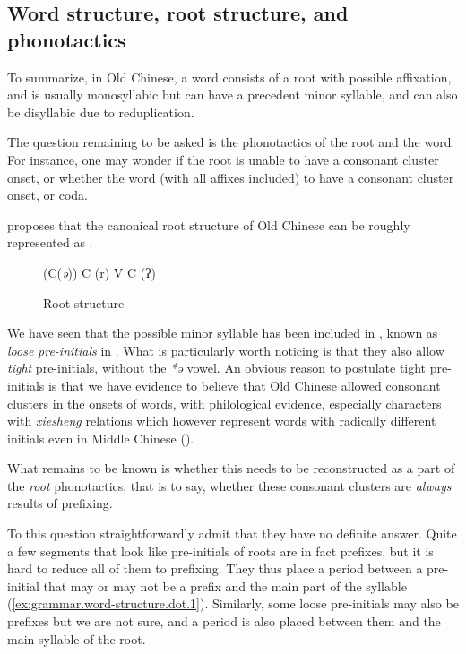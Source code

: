 \documentclass[UTF8, a4paper, oneside, scheme=plain, 12pt]{ctexrep}
\newcommand*{\citepage}[1]{p.~{#1}}
\newcommand*{\citepages}[1]{pp.~{#1}}
\newcommand{\form}[1]{\emph{#1}}
\begin{document}
\subsection{Word structure, root structure, and phonotactics}

To summarize, in Old Chinese, a word consists of a root with possible affixation,
and is usually monosyllabic but can have a precedent minor syllable,
and can also be disyllabic due to reduplication.

The question remaining to be asked is the phonotactics of the root and the word.
For instance, one may wonder if the root is unable to have a consonant cluster onset,
or whether the word (with all affixes included) to have a consonant cluster onset, or coda.

\citet[\citepages{50-52}]{baxter2014old} proposes that the canonical root structure of Old Chinese can be roughly represented as .

\begin{figure}[H]
    \caption{Root structure}
    \label{fig:root-structure}
    \centering
    (C(\form{ə})) C (r) V C (ʔ)
\end{figure}

We have seen that the possible minor syllable has been included in ,
known as \emph{loose} \emph{pre-initials} in \citet{baxter2014old}.
What is particularly worth noticing is that they also allow \emph{tight} pre-initials,
without the \form{*ə} vowel.
An obvious reason to postulate tight pre-initials is that we have evidence to believe that Old Chinese allowed consonant clusters in the onsets of words, with philological evidence, especially characters with \form{xiesheng} relations which however represent words with radically different initials even in Middle Chinese ().

What remains to be known is whether this needs to be reconstructed as a part of the \emph{root} phonotactics,
that is to say, whether these consonant clusters are \emph{always} results of prefixing.

To this question \citet[\citepage{51}]{baxter2014old} straightforwardly admit that they have no definite answer.
Quite a few segments that look like pre-initials of roots are in fact prefixes,
but it is hard to reduce all of them to prefixing.
They thus place a period between a pre-initial  that may or may not be a prefix and the main part of the syllable (\ref{ex:grammar.word-structure.dot.1}).
Similarly, some loose pre-initials may also be prefixes but we are not sure, and a period is also placed between them and the main syllable of the root.
\end{document}
